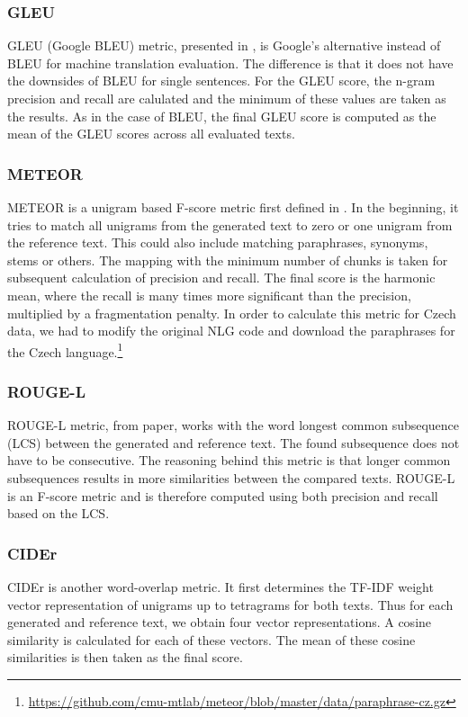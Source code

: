 \subsubsection*{GLEU}
GLEU (Google BLEU) metric, presented in \citet{wu2016google}, is Google's alternative instead of BLEU for machine translation evaluation. The difference is that it does not have the downsides of BLEU for single sentences. For the GLEU score, the n-gram precision and recall are calulated and the minimum of these values are taken as the results. As in the case of BLEU, the final GLEU score is computed as the mean of the GLEU scores across all evaluated texts.

\subsubsection*{METEOR}
METEOR is a unigram based F-score metric first defined in \citet{banerjee2005meteor}. In the beginning, it tries to match all unigrams from the generated text to zero or one unigram from the reference text. This could also include matching paraphrases, synonyms, stems or others. The mapping with the minimum number of chunks is taken for subsequent calculation of precision and recall. The final score is the harmonic mean, where the recall is many times more significant than the precision, multiplied by a fragmentation penalty. In order to calculate this metric for Czech data, we had to modify the original NLG code and download the paraphrases for the Czech language.\footnote[1]{\url{https://github.com/cmu-mtlab/meteor/blob/master/data/paraphrase-cz.gz}}

\subsubsection*{ROUGE-L}
ROUGE-L metric, from \citet{lin2004rouge} paper, works with the word longest common subsequence (LCS) between the generated and reference text. The found subsequence does not have to be consecutive. The reasoning behind this metric is that longer common subsequences results in more similarities between the compared texts. ROUGE-L is an F-score metric and is therefore computed using both precision and recall based on the LCS.

\subsubsection*{CIDEr}
CIDEr\citep{vedantam2015cider} is another word-overlap metric. It first determines the TF-IDF weight vector representation of unigrams up to tetragrams for both texts. Thus for each generated and reference text, we obtain four vector representations. A cosine similarity is calculated for each of these vectors. The mean of these cosine similarities is then taken as the final score.

